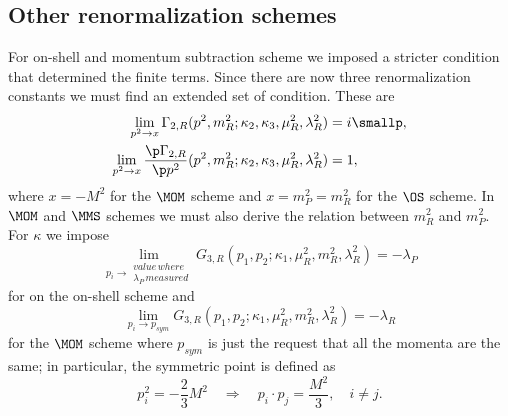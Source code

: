 \subsection{Other renormalization schemes}
For on-shell and momentum subtraction scheme we imposed a stricter condition that determined the finite terms. Since there are now three renormalization constants we must find an extended set of condition. These are
\begin{align}
    \lim_{p^2 \to x}\Gamma_{2,R}(p^2,m_R^2;\kappa_2,\kappa_3,\mu_R^2,\lambda_R^2) &= i\smallp, \\
    \lim_{p^2 \to x}\frac{\p\Gamma_{2,R}}{\p p^2}(p^2,m_R^2;\kappa_2,\kappa_3,\mu_R^2,\lambda_R^2) &= 1,
\end{align}
where $x = -M^2$ for the $\MOM$ scheme and $x = m_P^2 = m_R^2$ for the $\OS$ scheme. In $\MOM$ and $\MMS$ schemes we must also derive the relation between $m_R^2$ and $m_P^2$. For $\kappa$ we impose
\begin{equation}
    \lim_{p_i \to \substack{value\,where \\ \lambda_P\,measured}} G_{3,R}(p_1,p_2;\kappa_1,\mu_R^2,m_R^2,\lambda_R^2) = -\lambda_P
\end{equation}
for on the on-shell scheme and
\begin{equation}
    \lim_{p_i \to p_{sym}} G_{3,R}(p_1,p_2;\kappa_1,\mu_R^2,m_R^2,\lambda_R^2) = -\lambda_R
\end{equation}
for the $\MOM$ scheme where $p_{sym}$ is just the request that all the momenta are the same; in particular, the symmetric point is defined as
\begin{equation}
    p_i^2 = -\frac{2}{3}M^2\quad\Longrightarrow\quad p_i\cdot p_j = \frac{M^2}{3},\quad i \neq j.
\end{equation}

